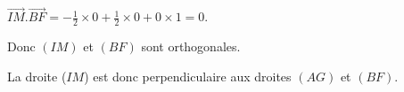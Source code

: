 \begin{corrige}
\begin{enumerate}
\begin{enumerate}[label=\alph*.]
\begin{itemize}
                    \par
                    $\overrightarrow{IM}.\overrightarrow{BF}=-\frac{1}{2} \times 0 + \frac{1}{2} \times 0 + 0 \times 1=0$.
                    \par
                    Donc $(IM)$ et $(BF)$ sont orthogonales.
               \end{itemize}
               La droite ($IM$) est donc perpendiculaire aux droites $(AG)$ et $(BF)$.
          \end{enumerate}
     \end{enumerate}
\end{corrige}
